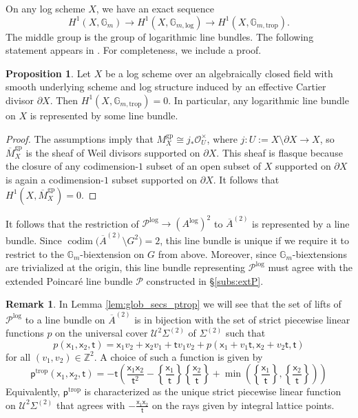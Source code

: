 \documentclass[11pt]{article}
\def\CO{\mathcal{O}}
\def\P{\mathcal{P}}
\def\ZZ{\mathbb{Z}}
\def\Gm{\mathbb{G}_m}
\def\Glog{\mathbb{G}_{m,\log}}
\def\gp{\mathrm{gp}}
\newcommand{\trop}{\mathrm{trop}}
\renewcommand{\log}{\mathrm{log}}
\newcommand{\barA}{\overline{A}}
\newcommand{\logA}{{A^{\log}}}
\theoremstyle{definition}
\newtheorem{proposition}[definition]{Proposition}
\newtheorem{remark}[definition]{Remark}
\begin{document}
On any log scheme $X$, we have an exact sequence
$$
 H^1(X, \Gm) \longrightarrow H^1(X, \Glog) \longrightarrow H^1(X, \mathbb G_{m,\trop}).
$$
The middle group is the group of logarithmic line bundles. The following statement appears in \cite{J}. For completeness, we include a proof.

\begin{proposition}\label{pro:logline}
    Let $X$ be a log scheme over an algebraically closed field with smooth underlying scheme and log structure induced by an effective Cartier divisor $\partial X$.
    Then $H^1(X, \mathbb G_{m,\trop})=0$. In particular, any logarithmic line bundle on $X$ is represented by some line bundle.
\end{proposition}

\begin{proof}
	The assumptions imply that $M_X^\gp \cong j_*\CO_U^\times$, where $j: U:=X\setminus\partial X \to X$, so $\overline{M}_X^\gp$ is the sheaf of Weil divisors supported on $\partial X$.
	This sheaf is flasque because the closure of any codimension-$1$ subset of an open subset of $X$ supported on $\partial X$ is again a codimension-$1$ subset supported on $\partial X$.
	It follows that $H^1(X,\overline{M}_X^\gp)=0$.
\end{proof}

It follows that the restriction of $\P^{\log} \to (\logA)^2$ to $\barA^{(2)}$ is represented by a line bundle. Since $\operatorname{codim}\big(\barA^{(2)} \setminus G^2\big)=2$, this line bundle is unique if we require it to restrict to the $\Gm$-biextension on $G$ from above. Moreover, since $\Gm$-biextensions are trivialized at the origin, this line bundle representing $\P^{\log}$ must agree with the extended Poincar\'e line bundle $\P$ constructed in \S\ref{subs:extP}.

\begin{remark}\label{rem:Ptrop}
	In Lemma \ref{lem:glob_secs_ptrop} we will see that the set of lifts of $\mathcal{P}^{\log}$ to a line bundle on $\barA^{(2)}$
	is in bijection with the set of strict piecewise linear functions $p$ on the universal cover $\mathcal U^2\Sigma^{(2)}$ of
	$\Sigma^{(2)}$ such that
	$$
    p(\mathsf{x}_1,\mathsf{x}_2,\mathsf{t})=\mathsf{x}_1v_2+\mathsf{x}_2v_1+\mathsf{t}v_1v_2+p(\mathsf{x}_1+v_1\mathsf{t},\mathsf{x}_2+v_2\mathsf{t},\mathsf{t})
    $$
    for all $(v_1, v_2) \in \ZZ^2$. A choice of such a function is given by
    $$
    \mathsf{p}^{\trop} (\mathsf{x}_1, \mathsf{x}_2, \mathsf{t}) = -\mathsf{t} \left(\frac{\mathsf{x}_1 \mathsf{x}_2}{\mathsf{t}^2} - \left\lbrace\frac{\mathsf{x}_1}{\mathsf{t}}\right\rbrace\left\lbrace\frac{\mathsf{x}_2}{\mathsf{t}}\right\rbrace + \min \left(\left\lbrace\frac{\mathsf{x}_1}{\mathsf{t}}\right\rbrace, \left\lbrace\frac{\mathsf{x}_2}{\mathsf{t}}\right\rbrace\right)\right)
    $$
    Equivalently, $\mathsf{p}^{\trop}$ is characterized as the unique strict piecewise linear function on $\mathcal U^2\Sigma^{(2)}$ that agrees with $-\frac{\mathsf{x}_1\mathsf{x}_2}{\mathsf{t}}$ on the rays given by integral lattice points.
\end{remark}
\end{document}
